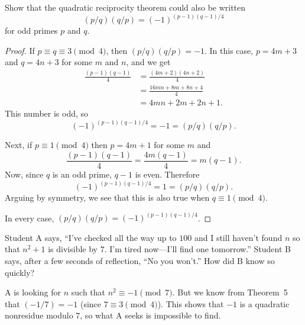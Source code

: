  Show that the quadratic reciprocity theorem could also be
written
\begin{equation*}
  (p/q)(q/p) = (-1)^{(p-1)(q-1)/4}
\end{equation*}
for odd primes $p$ and $q$.
\begin{proof}
  If $p\equiv q\equiv3\pmod4$, then $(p/q)(q/p) = -1$. In this case,
  $p = 4m + 3$ and $q = 4n + 3$ for some $m$ and $n$, and we get
  \begin{align*}
    \frac{(p-1)(q-1)}4
    &= \frac{(4m + 2)(4n + 2)}4 \\
    &= \frac{16mn + 8m + 8n + 4}4 \\
    &= 4mn + 2m + 2n + 1.
  \end{align*}
  This number is odd, so
  \begin{equation*}
    (-1)^{(p-1)(q-1)/4} = -1 = (p/q)(q/p).
  \end{equation*}

  Next, if $p\equiv1\pmod4$ then $p = 4m + 1$ for some $m$ and
  \begin{equation*}
    \frac{(p-1)(q-1)}4 = \frac{4m(q-1)}4 = m(q-1).
  \end{equation*}
  Now, since $q$ is an odd prime, $q-1$ is even. Therefore
  \begin{equation*}
    (-1)^{(p-1)(q-1)/4} = 1 = (p/q)(q/p).
  \end{equation*}
  Arguing by symmetry, we see that this is also true when
  $q\equiv1\pmod4$.

  In every case, $(p/q)(q/p) = (-1)^{(p-1)(q-1)/4}$.
\end{proof}

 Student A says, ``I've checked all the way up to $100$
and I still haven't found $n$ so that $n^2 + 1$ is divisible by
$7$. I'm tired now---I'll find one tomorrow.'' Student B says, after a
few seconds of reflection, ``No you won't.'' How did B know so
quickly?
\begin{solution}
  A is looking for $n$ such that $n^2\equiv-1\pmod7$. But we know from
  Theorem~5 that $(-1/7) = -1$ (since $7\equiv3\pmod4$). This shows
  that $-1$ is a quadratic nonresidue modulo $7$, so what A seeks is
  impossible to find.
\end{solution}
